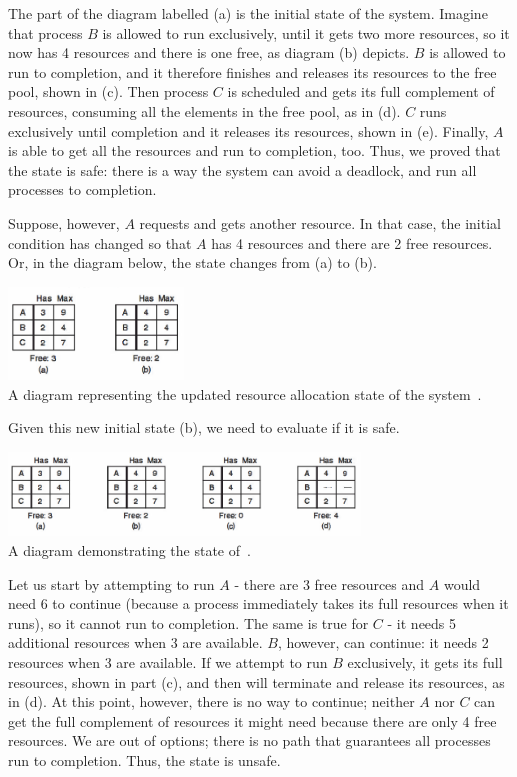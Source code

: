 \documentclass[a4paper]{report}
\begin{document}
The part of the diagram labelled (a) is the initial state of the system. Imagine that process $B$ is allowed to run exclusively, until it gets two more resources, so it now has 4 resources and there is one free, as diagram (b) depicts. $B$ is allowed to run to completion, and it therefore finishes and releases its resources to the free pool, shown in (c). Then process $C$ is scheduled and gets its full complement of resources, consuming all the elements in the free pool, as in (d). $C$ runs exclusively until completion and it releases its resources, shown in (e). Finally, $A$ is able to get all the resources and run to completion, too. Thus, we proved that the state is safe: there is a way the system can avoid a deadlock, and run all processes to completion.

Suppose, however, $A$ requests and gets another resource. In that case, the initial condition has changed so that $A$ has 4 resources and there are 2 free resources. Or, in the diagram below, the state changes from (a) to (b).

\begin{center}
	\includegraphics[width=0.35\textwidth]{images/unsafe-state-initial.png}\\
	A diagram representing the updated resource allocation state of the system~\cite{mos}.
\end{center}

Given this new initial state (b), we need to evaluate if it is safe.

\begin{center}
	\includegraphics[width=0.70\textwidth]{images/unsafe-state.png}\\
	A diagram demonstrating the state of~\cite{mos}.
\end{center}

Let us start by attempting to run $A$ - there are 3 free resources and $A$ would need 6 to continue (because a process immediately takes its full resources when it runs), so it cannot run to completion. The same is true for $C$ - it needs 5 additional resources when 3 are available. $B$, however, can continue: it needs 2 resources when 3 are available. If we attempt to run $B$ exclusively, it gets its full resources, shown in part (c), and then will terminate and release its resources, as in (d). At this point, however, there is no way to continue; neither $A$ nor $C$ can get the full complement of resources it might need because there are only 4 free resources. We are out of options; there is no path that guarantees all processes run to completion. Thus, the state is unsafe.
\end{document}
